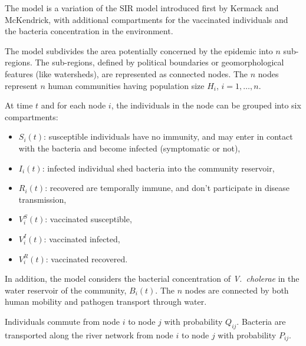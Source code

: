 The model is a variation of the SIR model introduced first by Kermack and McKendrick\cite{Kermack:ContributionMathematicalTheory:1927}, with additional compartments for the vaccinated individuals and the bacteria concentration in the environment.

The model subdivides the area potentially concerned by the epidemic into $n$ sub-regions. The sub-regions, defined by political boundaries or geomorphological features (like watersheds\cite{Bertuzzo:ProbabilityExtinctionHaiti:2016}), are represented as connected nodes. The $n$ nodes represent $n$ human communities having population size $H_i$, $i=1,\dots, n$. 

At time $t$ and for each node $i$, the individuals in the node can be grouped into six compartments:

\begin{itemize}
\item $S_i(t)$: susceptible individuals  have no immunity, and may enter in contact with the bacteria and become infected (symptomatic or not),
\item $I_i(t)$: infected individual shed bacteria into the community reservoir,
\item $R_i(t)$: recovered are temporally immune, and don't participate in disease transmission,
\item $V^S_i(t)$: vaccinated susceptible,
\item $V^I_i(t)$: vaccinated infected,
\item $V^R_i(t)$: vaccinated recovered.
\end{itemize}

In addition, the model considers the bacterial concentration of \textit{V.~cholerae} in the water reservoir of the community, $B_i(t)$. The $n$ nodes are connected by both human mobility and pathogen transport through water.

Individuals commute from node $i$ to node $j$ with probability $Q_{ij}$. Bacteria are transported along the river network from node $i$ to node $j$ with probability $P_{ij}$.

